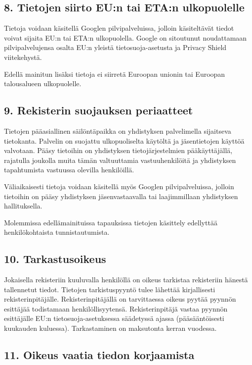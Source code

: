 \documentclass[finnish]{tktltiki}
\begin{document}
\subsection*{8. Tietojen siirto EU:n tai ETA:n ulkopuolelle}

Tietoja voidaan käsitellä Googlen pilvipalveluissa, jolloin käsiteltävät tiedot voivat sijaita EU:n tai ETA:n ulkopuolella. Google on sitoutunut noudattamaan pilvipalvelujensa osalta EU:n yleistä tietosuoja-asetusta ja Privacy Shield viitekehystä.

Edellä mainitun lisäksi tietoja ei siirretä Euroopan unionin tai Euroopan talousalueen ulkopuolelle.

\subsection*{9. Rekisterin suojauksen periaatteet}

Tietojen pääasiallinen säilöntäpaikka on yhdistyksen palvelimella sijaitseva tietokanta. Palvelin on suojattu ulkopuoliselta käytöltä ja jäsentietojen käyttöä valvotaan. Pääsy tietoihin on yhdistyksen tietojärjestelmien pääkäyttäjällä, rajatulla joukolla muita tämän valtuuttamia vastuuhenkilöitä ja yhdistyksen tapahtumista vastuussa olevilla henkilöillä.

Väliaikaisesti tietoja voidaan käsitellä myös Googlen pilvipalveluissa, jolloin tietoihin on pääsy yhdistyksen jäsenvastaavalla tai laajimmillaan yhdistyksen hallituksella.

Molemmissa edellämainituissa tapauksissa tietojen käsittely edellyttää henkilökohtaista tunnistautumista.

\subsection*{10. Tarkastusoikeus}

Jokaisella rekisteriin kuuluvalla henkilöllä on oikeus tarkistaa rekisteriin hänestä tallennetut tiedot. Tietojen tarkistuspyyntö tulee lähettää kirjallisesti rekisterinpitäjälle. Rekisterinpitäjällä on tarvittaessa oikeus pyytää pyynnön esittäjää todistamaan henkilöllisyytensä. Rekisterinpitäjä vastaa pyynnön esittäjälle EU:n tietosuoja-asetuksessa säädetyssä ajassa (pääsääntöisesti kuukauden kuluessa). Tarkastaminen on maksutonta kerran vuodessa.

\subsection*{11. Oikeus vaatia tiedon korjaamista}
\end{document}
